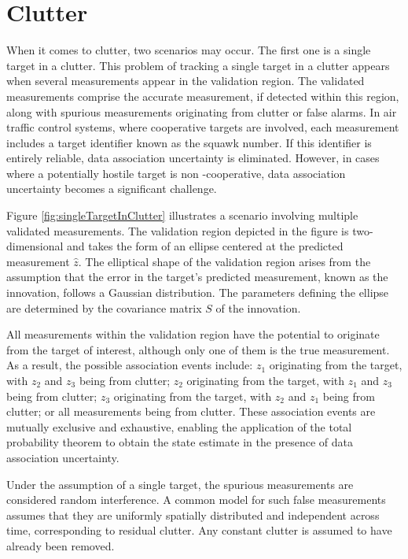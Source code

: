 \section{Clutter}
When it comes to clutter, two scenarios may occur. The first one is a single target in a clutter. This problem of
tracking a single target in a clutter appears when several measurements appear in the validation region. The
validated measurements comprise the accurate measurement, if detected within this region, along with spurious
measurements originating from clutter or false alarms. In air traffic control systems, where cooperative targets are
involved, each measurement includes a target identifier known as the squawk number. If this identifier is entirely
reliable, data association uncertainty is eliminated. However, in cases where a potentially hostile target is non
-cooperative, data association uncertainty becomes a significant challenge.

Figure \ref{fig:singleTargetInClutter} illustrates a scenario involving multiple validated measurements. The validation region depicted in the
figure is two-dimensional and takes the form of an ellipse centered at the predicted measurement $\hat{z}$. The
elliptical shape of the validation region arises from the assumption that the error in the target's predicted
measurement, known as the innovation, follows a Gaussian distribution. The parameters defining the ellipse are
determined by the covariance matrix $S$ of the innovation.

All measurements within the validation region have the potential to originate from the target of interest, although
only one of them is the true measurement. As a result, the possible association events include: $z_1$ originating
from the target, with $z_2$ and $z_3$ being from clutter; $z_2$ originating from the target, with $z_1$ and $z_3$
being from clutter; $z_3$ originating from the target, with $z_2$ and $z_1$ being from clutter; or all measurements
being from clutter. These association events are mutually exclusive and exhaustive, enabling the application of the
total probability theorem to obtain the state estimate in the presence of data association uncertainty.

Under the assumption of a single target, the spurious measurements are considered random interference. A common model for such false measurements assumes that they are uniformly spatially distributed and independent across time, corresponding to residual clutter. Any constant clutter is assumed to have already been removed.

